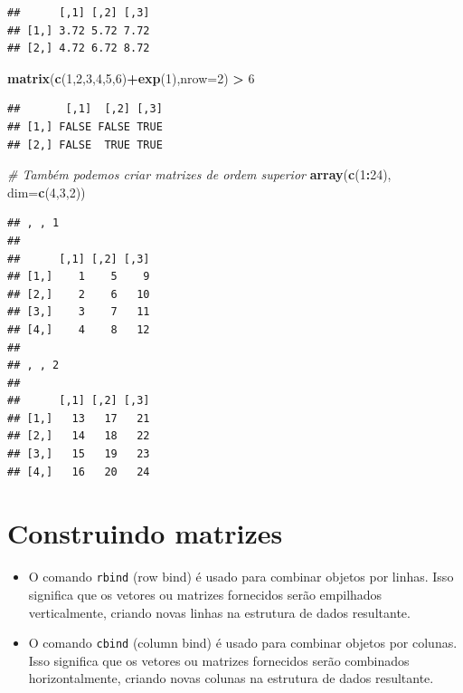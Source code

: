 \documentclass[
]{book}
\newenvironment{Shaded}{\begin{snugshade}}{\end{snugshade}}
\newcommand{\AttributeTok}[1]{\textcolor[rgb]{0.13,0.29,0.53}{#1}}
\newcommand{\CommentTok}[1]{\textcolor[rgb]{0.56,0.35,0.01}{\textit{#1}}}
\newcommand{\DecValTok}[1]{\textcolor[rgb]{0.00,0.00,0.81}{#1}}
\newcommand{\FunctionTok}[1]{\textcolor[rgb]{0.13,0.29,0.53}{\textbf{#1}}}
\newcommand{\NormalTok}[1]{#1}
\newcommand{\SpecialCharTok}[1]{\textcolor[rgb]{0.81,0.36,0.00}{\textbf{#1}}}
\theoremstyle{definition}
\theoremstyle{definition}
\theoremstyle{definition}
\theoremstyle{definition}
\theoremstyle{remark}
\begin{document}
\begin{verbatim}
##      [,1] [,2] [,3]
## [1,] 3.72 5.72 7.72
## [2,] 4.72 6.72 8.72
\end{verbatim}

\begin{Shaded}
\begin{Highlighting}[]
\FunctionTok{matrix}\NormalTok{(}\FunctionTok{c}\NormalTok{(}\DecValTok{1}\NormalTok{,}\DecValTok{2}\NormalTok{,}\DecValTok{3}\NormalTok{,}\DecValTok{4}\NormalTok{,}\DecValTok{5}\NormalTok{,}\DecValTok{6}\NormalTok{)}\SpecialCharTok{+}\FunctionTok{exp}\NormalTok{(}\DecValTok{1}\NormalTok{),}\AttributeTok{nrow=}\DecValTok{2}\NormalTok{) }\SpecialCharTok{\textgreater{}} \DecValTok{6}
\end{Highlighting}
\end{Shaded}

\begin{verbatim}
##       [,1]  [,2] [,3]
## [1,] FALSE FALSE TRUE
## [2,] FALSE  TRUE TRUE
\end{verbatim}

\begin{Shaded}
\begin{Highlighting}[]
\CommentTok{\# Também podemos criar matrizes de ordem superior}
\FunctionTok{array}\NormalTok{(}\FunctionTok{c}\NormalTok{(}\DecValTok{1}\SpecialCharTok{:}\DecValTok{24}\NormalTok{), }\AttributeTok{dim=}\FunctionTok{c}\NormalTok{(}\DecValTok{4}\NormalTok{,}\DecValTok{3}\NormalTok{,}\DecValTok{2}\NormalTok{))}
\end{Highlighting}
\end{Shaded}

\begin{verbatim}
## , , 1
## 
##      [,1] [,2] [,3]
## [1,]    1    5    9
## [2,]    2    6   10
## [3,]    3    7   11
## [4,]    4    8   12
## 
## , , 2
## 
##      [,1] [,2] [,3]
## [1,]   13   17   21
## [2,]   14   18   22
## [3,]   15   19   23
## [4,]   16   20   24
\end{verbatim}

\section{Construindo matrizes}\label{construindo-matrizes}

\begin{itemize}
\item
  O comando \texttt{rbind} (row bind) é usado para combinar objetos por linhas. Isso significa que os vetores ou matrizes fornecidos serão empilhados verticalmente, criando novas linhas na estrutura de dados resultante.
\item
  O comando \texttt{cbind} (column bind) é usado para combinar objetos por colunas. Isso significa que os vetores ou matrizes fornecidos serão combinados horizontalmente, criando novas colunas na estrutura de dados resultante.
\end{itemize}
\end{document}
